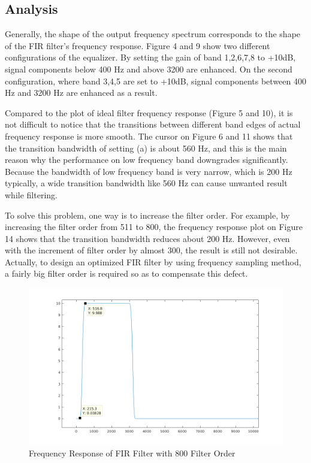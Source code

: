 \documentclass[titlepage]{article}
\begin{document}
\newpage
\subsection{Analysis}
\label{sec:org82a7cea}
Generally, the shape of the output frequency spectrum corresponds to the
shape of the FIR filter's frequency response. Figure 4 and 9 show two
different configurations of the equalizer. By setting the gain of band
1,2,6,7,8 to +10dB, signal components below 400 Hz and above 3200 are
enhanced. On the second configuration, where band 3,4,5 are set to +10dB,
signal components between 400 Hz and 3200 Hz are enhanced as a result.

Compared to the plot of ideal filter frequency response (Figure 5 and 10), it
is not difficult to notice that the transitions between different band edges
of actual frequency response is more smooth. The cursor on Figure 6 and 11
shows that the transition bandwidth of setting (a) is about 560 Hz, and this
is the main reason why the performance on low frequency band downgrades
significantly. Because the bandwidth of low frequency band is very narrow,
which is 200 Hz typically, a wide transition bandwidth like 560 Hz can cause
unwanted result while filtering.

To solve this problem, one way is to increase the filter order. For example,
by increasing the filter order from 511 to 800, the frequency response plot
on Figure 14 shows that the transition bandwidth reduces about 200 Hz.
However, even with the increment of filter order by almost 300, the result is
still not desirable. Actually, to design an optimized FIR filter by using
frequency sampling method, a fairly big filter order is required so as to
compensate this defect.

\begin{figure}[htbp]
\centering
\includegraphics[width=.9\linewidth]{higher_order.png}
\caption{Frequency Response of FIR Filter with 800 Filter Order}
\end{figure}
\end{document}
